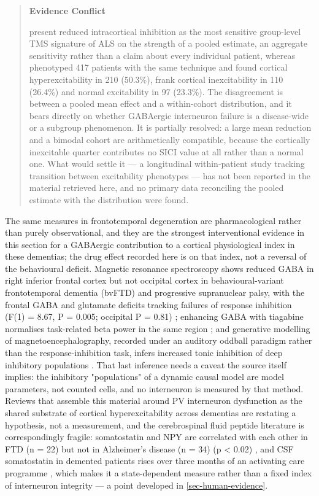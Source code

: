 \documentclass[11pt]{article}
\begin{document}
\begin{quote}
\noindent\textbf{Evidence Conflict}\par
\citet{Higashihara2024} present reduced intracortical inhibition as the most sensitive group-level TMS signature of ALS on the strength of a pooled estimate, an aggregate sensitivity rather than a claim about every individual patient, whereas \citet{Pavey2024} phenotyped 417 patients with the same technique and found cortical hyperexcitability in 210 (50.3\%), frank cortical inexcitability in 110 (26.4\%) and normal excitability in 97 (23.3\%). The disagreement is between a pooled mean effect and a within-cohort distribution, and it bears directly on whether GABAergic interneuron failure is a disease-wide or a subgroup phenomenon. It is partially resolved: a large mean reduction and a bimodal cohort are arithmetically compatible, because the cortically inexcitable quarter contributes no SICI value at all rather than a normal one. What would settle it --- a longitudinal within-patient study tracking transition between excitability phenotypes --- has not been reported in the material retrieved here, and no primary data reconciling the pooled estimate with the distribution were found.

\end{quote}

The same measures in frontotemporal degeneration are pharmacological rather than purely observational, and they are the strongest interventional evidence in this section for a GABAergic contribution to a cortical physiological index in these dementias; the drug effect recorded here is on that index, not a reversal of the behavioural deficit. Magnetic resonance spectroscopy shows reduced GABA in right inferior frontal cortex but not occipital cortex in behavioural-variant frontotemporal dementia (bvFTD) and progressive supranuclear palsy, with the frontal GABA and glutamate deficits tracking failures of response inhibition (F(1) = 8.67, P = 0.005; occipital P = 0.81) \citep{Murley2020}; enhancing GABA with tiagabine normalises task-related beta power in the same region \citep{Hughes2025}; and generative modelling of magnetoencephalography, recorded under an auditory oddball paradigm rather than the response-inhibition task, infers increased tonic inhibition of deep inhibitory populations \citep{Adams2021}. That last inference needs a caveat the source itself implies: the inhibitory "populations" of a dynamic causal model are model parameters, not counted cells, and no interneuron is measured by that method. Reviews that assemble this material around PV interneuron dysfunction as the shared substrate of cortical hyperexcitability across dementias \citep{Smeralda2024} are restating a hypothesis, not a measurement, and the cerebrospinal fluid peptide literature is correspondingly fragile: somatostatin and NPY are correlated with each other in FTD (n = 22) but not in Alzheimer's disease (n = 34) (p < 0.02) \citep{Minthon1997}, and CSF somatostatin in demented patients rises over three months of an activating care programme \citep{WiderloV1989}, which makes it a state-dependent measure rather than a fixed index of interneuron integrity --- a point developed in \ref{sec-human-evidence}.
\end{document}
